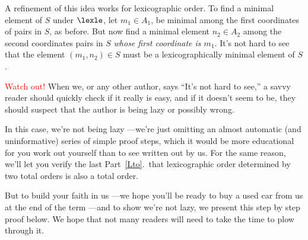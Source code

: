 A refinement of this idea works for lexicographic order.  To find a
minimal element of $S$ under $\lexle$, let $m_1 \in A_1$, be minimal among
the first coordinates of pairs in $S$, as before.  But now find a minimal
element $n_2 \in A_2$ among the second coordinates pairs in $S$
\emph{whose first coordinate is $m_1$}.  It's not hard to see that the
element $(m_1,n_2) \in S$ must be a lexicographically minimal element of
$S$.

\textcolor{red}{Watch out!}  When we, or any other author, says ``It's not
hard to see,'' a savvy reader should quickly check if it really is easy,
and if it doesn't seem to be, they should suspect that the author is being
lazy or possibly wrong.

In this case, we're not being lazy ---we're just omitting an almost
automatic (and uninformative) series of simple proof steps, which it would
be more educational for you work out yourself than to see written out by
us.  For the same reason, we'll let you verify the last Part~\ref{Lto}.\
that lexicographic order determined by two total orders is also a total
order.

\iffalse
But to build your faith in us ---we hope you'll be ready to buy a used car
from us at the end of the term ---and to show we're not lazy, we present
this step by step proof below.  We hope that not many readers will need to
take the time to plow through it.

